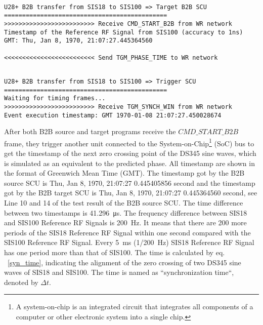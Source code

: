 \begin{lstlisting}[language={[ANSI]C}, keywordstyle=\color{blue!70}, commentstyle=\color{red!50!green!50!blue!50}, frame=shadowbox, rulesepcolor=\color{red!20!green!20!blue!20}]

U28+ B2B transfer from SIS18 to SIS100 => Target B2B SCU
=============================================
>>>>>>>>>>>>>>>>>>>>>>>>> Receive CMD_START_B2B from WR network
Timestamp of the Reference RF Signal from SIS100 (accuracy to 1ns)
GMT: Thu, Jan 8, 1970, 21:07:27.445364560

<<<<<<<<<<<<<<<<<<<<<<<<< Send TGM_PHASE_TIME to WR network
\end{lstlisting}

\begin{lstlisting}[language={[ANSI]C}, keywordstyle=\color{blue!70}, commentstyle=\color{red!50!green!50!blue!50}, frame=shadowbox, rulesepcolor=\color{red!20!green!20!blue!20}]

U28+ B2B transfer from SIS18 to SIS100 => Trigger SCU
=============================================
Waiting for timing frames...
>>>>>>>>>>>>>>>>>>>>>>>>> Receive TGM_SYNCH_WIN from WR network
Event execution timestamp: GMT 1970-01-08 21:07:27.450028674
\end{lstlisting}

After both B2B source and target programs receive the $CMD\_START\_B2B$ frame, they trigger another unit connected to the System-on-Chip\footnote{A system-on-chip is an integrated circuit that integrates all components of a computer or other electronic system into a single chip.}  (SoC) bus to get the timestamp of the next zero crossing point of the DS345 sine waves, which is simulated as an equivalent to the predicted phase. All timestamp are shown in the format of Greenwich Mean Time (GMT). The timestamp got by the B2B source SCU is Thu, Jan 8, 1970, 21:07:27 0.445405856 second and the timestamp got by the B2B target SCU is Thu, Jan 8, 1970, 21:07:27 0.445364560 second, see Line 10 and 14 of the test result of the B2B source SCU. The time difference between two timestamps is \SI{41.296}{\us}. The frequency difference between SIS18 and SIS100 Reference RF Signals is \SI{200}{Hz}. It means that there are 200 more periods of the SIS18 Reference RF Signal within one second compared with the SIS100 Reference RF Signal. Every \SI{5}{ms} (1/\SI{200}{Hz}) SIS18 Reference RF Signal has one period more than that of SIS100. The time is calculated by eq. ~\ref {syn_time}, indicating the alignment of the zero crossing of two DS345 sine waves of SIS18 and SIS100. The time is named as ``synchronization time``, denoted by $\Delta t$.

